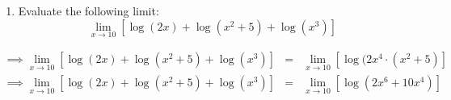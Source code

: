 \documentclass[10pt,paper=letter]{scrartcl}
\begin{document}
\begin{enumerate}[resume, label=\arabic*.,font=\bfseries]
\begin{enumerate}
\begin{equation*}
\begin{array}{lll}
                \implies \displaystyle \mathop {\lim }\limits_{x \to \infty} \frac{7x - 8x^2 +9x^3}{{3x^2 +2x + x^3}} & = & \displaystyle \mathop {\lim }\limits_{x \to \infty} 9 - \left(\frac{59}{x+2} - \frac{24}{x+1}\right)\\
                
                \implies \displaystyle \mathop {\lim }\limits_{x \to \infty} \frac{7x - 8x^2 +9x^3}{{3x^2 +2x + x^3}} & = & \displaystyle \mathop {\lim }\limits_{x \to \infty} 9 - \left((59)\left(\frac{1}{x+2}\right) - (24)\left(\frac{1}{x+1}\right)\right) \quad (\text{by (1) \footnote{ \href{https://www.youtube.com/watch?v=QKkdYW77xNI}{partial fraction decomposition}}})\\
                
                \implies \displaystyle \mathop {\lim }\limits_{x \to \infty} \frac{7x - 8x^2 +9x^3}{{3x^2 +2x + x^3}} & = & \displaystyle \mathop {\lim }\limits_{x \to \infty} 9 - \left((59)\left(\frac{1}{x+2}\right) - (24)\left(\frac{1}{x+1}\right)\right)\quad \left(\text{Use the fact that $\displaystyle \mathop {\lim }\limits_{x \to \infty} \dfrac{1}{x} = 0$}\right)\\
                
                      \implies \displaystyle \mathop {\lim }\limits_{x \to \infty} \frac{7x - 8x^2 +9x^3}{{3x^2 +2x + x^3}} & = & \displaystyle \mathop {\lim }\limits_{x \to \infty} 9 = \fbox{9}\\
            \end{array}
        \end{equation*}
    
    \item[(b)] Evaluate the following limit:
    $$\displaystyle \mathop {\lim }\limits_{x \to 10} [ \log(2x) + \log (x^2 +5) + \log(x^3)]$$
    \end{enumerate}
    
    
    \sol
    
    \begin{equation*}
        \begin{array}{lll}
             \implies  \displaystyle \mathop {\lim }\limits_{x \to 10} [ \log(2x) + \log (x^2 +5) + \log(x^3)] &  = & \displaystyle \mathop {\lim }\limits_{x \to 10} [ \log(2x^4 \cdot (x^2+5) ]\\
             
             
                  \implies  \displaystyle \mathop {\lim }\limits_{x \to 10} [ \log(2x) + \log (x^2 +5) + \log(x^3)] &  = & \displaystyle \mathop {\lim }\limits_{x \to 10} [ \log (2x^6+10x^4) ]\\
                  

\end{array}
\end{equation*}
\end{enumerate}
\end{document}
